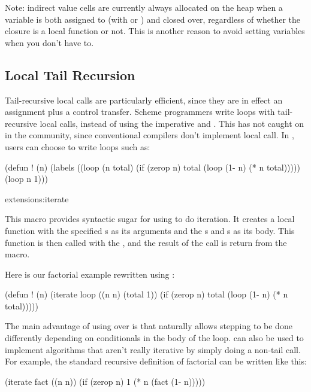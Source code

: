 Note: indirect value cells are currently always allocated on the heap
when a variable is both assigned to (with  or )
and closed over, regardless of whether the closure is a local function
or not.  This is another reason to avoid setting variables when you
don't have to.


\subsection{Local Tail Recursion}
\label{local-tail-recursion}

Tail-recursive local calls are particularly efficient, since they are
in effect an assignment plus a control transfer.  Scheme programmers
write loops with tail-recursive local calls, instead of using the
imperative  and .  This has not caught on in the
\clisp{} community, since conventional \llisp{} compilers don't
implement local call.  In \python, users can choose to write loops
such as:
\begin{lisp}
(defun ! (n)
  (labels ((loop (n total)
             (if (zerop n)
                 total
                 (loop (1- n) (* n total)))))
    (loop n 1)))
\end{lisp}

\begin{defmac}{extensions:}{iterate}{%
    }
  
  This macro provides syntactic sugar for using  to
  do iteration.  It creates a local function  with the
  specified s as its arguments and the s and
  s as its body.  This function is then called with the
  , and the result of the call is return from the
  macro.

  Here is our factorial example rewritten using :

  \begin{lisp}
    (defun ! (n)
      (iterate loop
               ((n n)
               (total 1))
        (if (zerop n)
          total
          (loop (1- n) (* n total)))))
  \end{lisp}
      
  The main advantage of using  over  is that
   naturally allows stepping to be done differently
  depending on conditionals in the body of the loop.  
  can also be used to implement algorithms that aren't really
  iterative by simply doing a non-tail call.  For example, the
  standard recursive definition of factorial can be written like this:
\begin{lisp}
(iterate fact
         ((n n))
  (if (zerop n)
      1
      (* n (fact (1- n)))))
\end{lisp}
\end{defmac}


